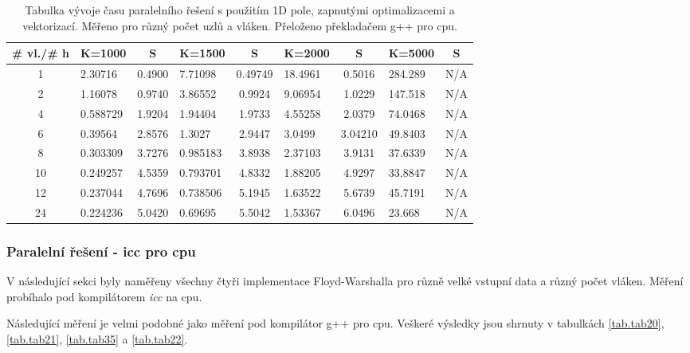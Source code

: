 \documentclass[a4paper,11pt]{article}
\begin{document}
    \begin{table}[ht]
  \begin{center}
   \begin{tabular}{|c|l|c|l|c|l|c|l|c|}
    \hline 
    \# vl./\# h & K=1000 & S & K=1500 & S & K=2000 & S & K=5000 & S \\
   \hline 
   \hline 
   1 & 2.30716 & 0.4900 & 7.71098 & 0.49749 & 18.4961 & 0.5016 & 284.289 & N/A\\
   \hline
    2 & 1.16078 & 0.9740 & 3.86552 & 0.9924 & 9.06954 & 1.0229 & 147.518 & N/A\\
   \hline
    4 & 0.588729 & 1.9204 & 1.94404 & 1.9733 & 4.55258 & 2.0379 & 74.0468 & N/A\\
   \hline
    6 & 0.39564 & 2.8576 & 1.3027 & 2.9447 & 3.0499 & 3.04210 & 49.8403 & N/A\\
   \hline
    8 & 0.303309 & 3.7276 & 0.985183 & 3.8938 & 2.37103 & 3.9131 & 37.6339 & N/A\\
      \hline
    10 & 0.249257 & 4.5359 & 0.793701 & 4.8332 & 1.88205 & 4.9297 & 33.8847 & N/A\\ 
      \hline
    12 & 0.237044 & 4.7696 & 0.738506 & 5.1945 & 1.63522 & 5.6739 & 45.7191 & N/A\\
      \hline
    24 & 0.224236 & 5.0420 & 0.69695 & 5.5042 & 1.53367 & 6.0496 & 23.668 & N/A\\
   \hline    
    \end{tabular}
   \caption{Tabulka vývoje času paralelního řešení s použitím 1D pole, zapnutými optimalizacemi a vektorizací. Měřeno pro různý počet uzlů a vláken. Přeloženo 
   překladačem g++ pro cpu.}
   \label{tab.tab19}
  \end{center}   
  \end{table}
  
  
  \subsubsection{Paralelní řešení - icc pro cpu}
  V následující sekci byly naměřeny všechny čtyři implementace Floyd-Warshalla pro různě velké vstupní data a 
  různý počet vláken. Měření probíhalo pod kompilátorem \textit{icc} na cpu.
  
  Následující měření je velmi podobné jako měření pod kompilátor g++ pro cpu. Veškeré výsledky
  jsou shrnuty v tabulkách \ref{tab.tab20},
  \ref{tab.tab21}, \ref{tab.tab35} a \ref{tab.tab22}.
  
\end{document}
